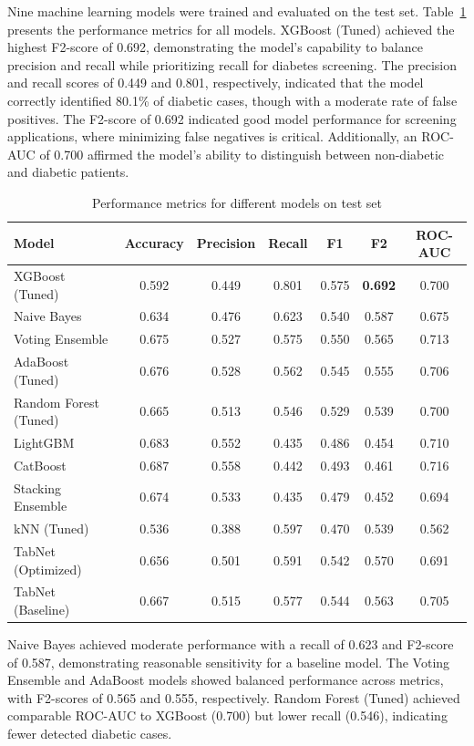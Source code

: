Nine machine learning models were trained and evaluated on the test set. Table~\ref{tab:model_performance} presents the performance metrics for all models. XGBoost (Tuned) achieved the highest F2-score of 0.692, demonstrating the model's capability to balance precision and recall while prioritizing recall for diabetes screening. The precision and recall scores of 0.449 and 0.801, respectively, indicated that the model correctly identified 80.1\% of diabetic cases, though with a moderate rate of false positives. The F2-score of 0.692 indicated good model performance for screening applications, where minimizing false negatives is critical. Additionally, an ROC-AUC of 0.700 affirmed the model's ability to distinguish between non-diabetic and diabetic patients.

\begin{table}[htbp]
\centering
\caption{Performance metrics for different models on test set}
\label{tab:model_performance}
\begin{tabular}{lcccccc}
\hline
\textbf{Model} & \textbf{Accuracy} & \textbf{Precision} & \textbf{Recall} & \textbf{F1} & \textbf{F2} & \textbf{ROC-AUC} \\
\hline
XGBoost (Tuned) & 0.592 & 0.449 & 0.801 & 0.575 & \textbf{0.692} & 0.700 \\
Naive Bayes & 0.634 & 0.476 & 0.623 & 0.540 & 0.587 & 0.675 \\
Voting Ensemble & 0.675 & 0.527 & 0.575 & 0.550 & 0.565 & 0.713 \\
AdaBoost (Tuned) & 0.676 & 0.528 & 0.562 & 0.545 & 0.555 & 0.706 \\
Random Forest (Tuned) & 0.665 & 0.513 & 0.546 & 0.529 & 0.539 & 0.700 \\
LightGBM & 0.683 & 0.552 & 0.435 & 0.486 & 0.454 & 0.710 \\
CatBoost & 0.687 & 0.558 & 0.442 & 0.493 & 0.461 & 0.716 \\
Stacking Ensemble & 0.674 & 0.533 & 0.435 & 0.479 & 0.452 & 0.694 \\
kNN (Tuned) & 0.536 & 0.388 & 0.597 & 0.470 & 0.539 & 0.562 \\
TabNet (Optimized) & 0.656 & 0.501 & 0.591 & 0.542 & 0.570 & 0.691 \\
TabNet (Baseline) & 0.667 & 0.515 & 0.577 & 0.544 & 0.563 & 0.705 \\
\hline
\end{tabular}
\end{table}

Naive Bayes achieved moderate performance with a recall of 0.623 and F2-score of 0.587, demonstrating reasonable sensitivity for a baseline model. The Voting Ensemble and AdaBoost models showed balanced performance across metrics, with F2-scores of 0.565 and 0.555, respectively. Random Forest (Tuned) achieved comparable ROC-AUC to XGBoost (0.700) but lower recall (0.546), indicating fewer detected diabetic cases.

